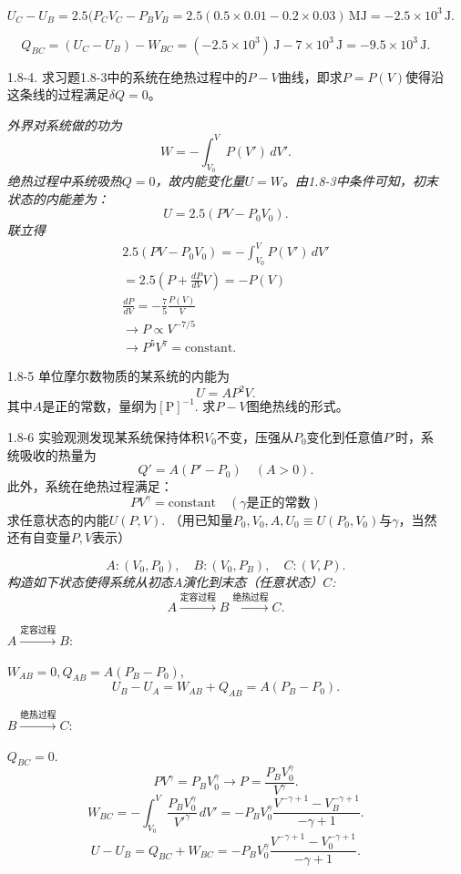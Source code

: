 \begin{enumerate}
{			\[ U_C - U_B = 2.5(P_C V_C - P_B V_B = 2.5(0.5\times 0.01 - 0.2 \times 0.03) \,\mathrm{MJ} = -2.5 \times 10^3 \,\mathrm{J}. \]

			\[ Q_{BC} = (U_C - U_B) - W_{BC} = (-2.5 \times 10^3) \,\mathrm{J} - 7 \times 10^{3} \,\mathrm{J} = -9.5 \times 10^3 \,\mathrm{J}. \]
		}

	\item[1.8-4.]
		求习题1.8-3中的系统在绝热过程中的$P-V$曲线，即求$P = P(V)$使得沿这条线的过程满足$\delta Q = 0$。

		{\it
			外界对系统做的功为
				\[ W = -\int_{V_0}^{V} P(V') \, dV'. \]
			绝热过程中系统吸热$Q = 0$，故内能变化量$U = W$。由1.8-3中条件可知，初末状态的内能差为：
				\[ U = 2.5(P V - P_0 V_0). \]
			联立得
				\begin{align*}
					2.5 (PV - P_0 V_0) = -\int_{V_0}^V P(V') \, dV' \\
					= 2.5 \left(P + \frac{dP}{dV} V \right) = -P(V) \\
					\frac{dP}{dV} = -\frac{7}{5} \frac{P(V)}{V} \\
					\to P \propto V^{-7/5} \\
					\to P^5 V^7 = \mathrm{constant}.
				\end{align*}
		}
	\item[1.8-5]
		单位摩尔数物质的某系统的内能为
		\[ U = AP^2 V. \]
		其中$A$是正的常数，量纲为$[\mathrm{P}]^{-1}$. 求$P-V$图绝热线的形式。

	\item[1.8-6]
		实验观测发现某系统保持体积$V_0$不变，压强从$P_0$变化到任意值$P'$时，系统吸收的热量为
		\[ Q' = A(P' - P_0) \quad(A > 0). \]
		此外，系统在绝热过程满足：
		\[ P V^\gamma = \text{constant} \quad (\gamma\text{是正的常数}) \]
		求任意状态的内能$U(P, V)$. （用已知量$P_0, V_0, A, U_0 \equiv U(P_0, V_0)\text{与} \gamma$，当然还有自变量$P, V$表示）

		{\it
			\[ A: (V_0, P_0), \quad B: (V_0, P_B), \quad C: (V, P). \]
			构造如下状态使得系统从初态$A$演化到末态（任意状态）$C$:
			\[ A \stackrel{\text{定容过程}}{\longrightarrow} B \stackrel{\text{绝热过程}}{\longrightarrow} C. \]

			$A \stackrel{\text{定容过程}}{\longrightarrow} B$: 
				
			$W_{AB} = 0, Q_{AB} = A(P_B - P_0)$,
			\[ U_B - U_A = W_{AB} + Q_{AB} = A(P_B - P_0). \]

			$B \stackrel{\text{绝热过程}}{\longrightarrow} C$: 
				
			$Q_{BC} = 0$.
			\[ P V^\gamma = P_B V_0^\gamma \to P = \frac{P_B V_0^\gamma}{V^\gamma}. \]
			\[ W_{BC} = -\int_{V_0}^{V} \frac{P_B V_0^\gamma}{V'^\gamma} \,dV' = -P_B V_0^\gamma \frac{V^{-\gamma + 1} - V_B^{-\gamma + 1}}{-\gamma + 1}. \]
			\[ U - U_B = Q_{BC} + W_{BC} = -P_B V_0^\gamma \frac{V^{-\gamma + 1} - V_0^{-\gamma + 1}}{-\gamma + 1}. \]

}
\end{enumerate}
